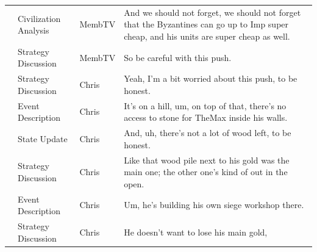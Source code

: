 {\begin{longtable}{@{}>{\theAppRow}r|L{2.3cm}L{1.0cm}U{11.55cm}@{}}
    & Civilization Analysis & MembTV       & And we should not forget, we should not forget that the Byzantines can go up to Imp super cheap, and his units are super cheap as well.                                                                                                                          \\
    & Strategy Discussion   & MembTV       & So be careful with this push.                                                                                                                                                                                                                                    \\
    & Strategy Discussion   & Chris        & Yeah, I'm a bit worried about this push, to be honest.                                                                                                                                                                                                           \\
    & Event Description     & Chris        & It's on a hill, um, on top of that, there's no access to stone for TheMax inside his walls.                                                                                                                                                                      \\
    & State Update          & Chris        & And, uh, there's not a lot of wood left, to be honest.                                                                                                                                                                                                           \\
    & Strategy Discussion   & Chris        & Like that wood pile next to his gold was the main one; the other one's kind of out in the open.                                                                                                                                                                  \\
    & Event Description     & Chris        & Um, he's building his own siege workshop there.                                                                                                                                                                                                                  \\
    & Strategy Discussion   & Chris        & He doesn't want to lose his main gold,                                                                                                                                                                                                                           \\

\end{longtable}}
